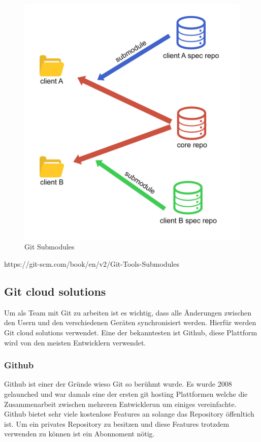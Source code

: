 \begin{figure}[h!]
    \centering
    \includegraphics[width=0.6\linewidth]{pics/git-submodules.jpg}
    \caption{Git Submodules}
    \label{fig:enter-label}
\end{figure}





https://git-scm.com/book/en/v2/Git-Tools-Submodules


\subsection{Git cloud solutions}

Um als Team mit Git zu arbeiten ist es wichtig, dass alle Änderungen zwischen den Usern und den verschiedenen Geräten synchronisiert werden. Hierfür werden Git cloud solutions verwendet. Eine der bekanntesten ist Github, diese Plattform wird von den meisten Entwicklern verwendet.

\subsubsection{Github}

Github ist einer der Gründe wieso Git so berühmt wurde. Es wurde 2008 gelaunched und war damals eine der ersten git hosting Plattformen welche die Zusammenarbeit zwischen mehreren Entwicklerun um einiges vereinfachte. Github bietet sehr viele kostenlose Features an solange das Repository öffenltich ist. Um ein privates Repository zu besitzen und diese Features trotzdem verwenden zu können ist ein Abonnoment nötig.

\cite{Github_1}
\cite{Github_2}